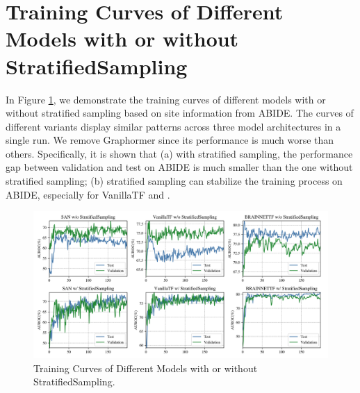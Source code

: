\section{Training Curves of Different Models with or without StratifiedSampling}
\label{app:setting}
In Figure \ref{fig:setting}, we demonstrate the training curves of different models with or without stratified sampling based on site information from ABIDE. The curves of different variants display similar patterns across three model architectures in a single run. We remove Graphormer since its performance is much worse than others. Specifically, it is shown that (a) with stratified sampling, the performance gap between validation and test on ABIDE is much smaller than the one without stratified sampling; (b) stratified sampling can stabilize the training process on ABIDE, especially for VanillaTF and \methodtable.
\begin{figure}[h]
	\centering
	\includegraphics[width=1.0\linewidth]{figures/settingcompare.png}
	\caption{Training Curves of Different Models with or without StratifiedSampling.}
	\label{fig:setting}
\end{figure}

